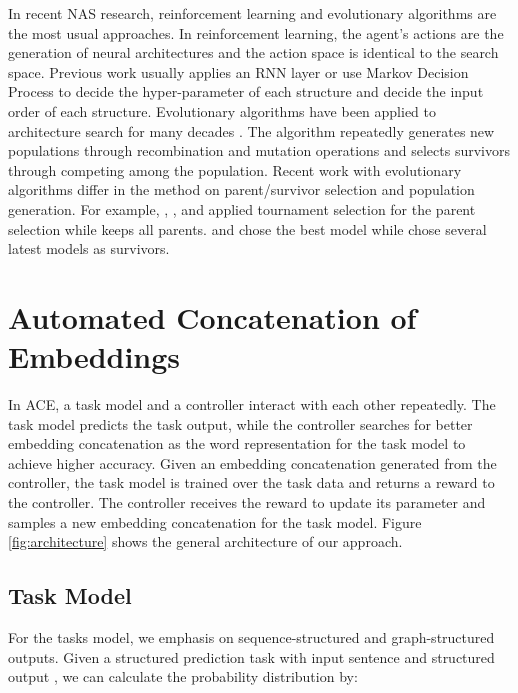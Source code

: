 \documentclass{article} \usepackage{iclr2021_conference,times}
\begin{document}
In recent NAS research, reinforcement learning and evolutionary algorithms are the most usual approaches. 
In reinforcement learning, the agent's actions are the generation of neural architectures and the action space is identical to the search space. Previous work usually applies an RNN layer \citep{zoph2016neural,zhong2018practical,zoph2018learning} or use Markov Decision Process \citep{baker2016designing} to decide the hyper-parameter of each structure and decide the input order of each structure.
Evolutionary algorithms have been applied to architecture search for many decades \citep{geoffrey1989designing,angeline1994evolutionary,stanley2002evolving,floreano2008neuroevolution,jozefowicz2015empirical}. The algorithm repeatedly generates new populations through recombination and mutation operations and selects survivors through competing among the population. Recent work with evolutionary algorithms differ in the method on parent/survivor selection and population generation. For example, \citet{real2017large}, \citet{liu2018hierarchical}, \citet{wistuba2018deep} and \citet{real2019regularized} applied tournament selection \citep{goldberg1991comparative} for the parent selection while \citet{xie2017genetic} keeps all parents. \citet{suganuma2017genetic} and \citet{elsken2017simple} chose the best model while \citet{real2019regularized} chose several latest models as survivors.







\section{Automated Concatenation of Embeddings}
In ACE, a task model and a controller interact with each other repeatedly. The task model predicts the task output, while the controller searches for better embedding concatenation as the word representation for the task model to achieve higher accuracy. Given an embedding concatenation generated from the controller, the task model is trained over the task data and returns a reward to the controller. The controller receives the reward to update its parameter and samples a new embedding concatenation for the task model. 
Figure \ref{fig:architecture} shows the general architecture of our approach.
\subsection{Task Model}
For the tasks model, we emphasis on sequence-structured and graph-structured outputs. Given a structured prediction task with input sentence  and structured output , we can calculate the probability distribution  by:
\end{document}
